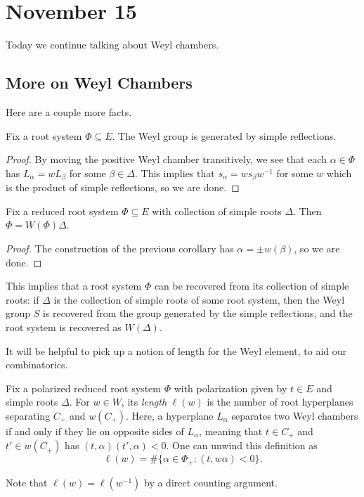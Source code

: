 \documentclass[../notes.tex]{subfiles}
\begin{document}
\section{November 15}
Today we continue talking about Weyl chambers.

\subsection{More on Weyl Chambers}
Here are a couple more facts.
\begin{corollary}
	Fix a root system $\Phi\subseteq E$. The Weyl group is generated by simple reflections.
\end{corollary}
\begin{proof}
	By moving the positive Weyl chamber transitively, we see that each $\alpha\in\Phi$ has $L_\alpha=wL_{\beta}$ for some $\beta\in\Delta$. This implies that $s_\alpha=ws_\beta w^{-1}$ for some $w$ which is the product of simple reflections, so we are done.
\end{proof}
\begin{corollary}
	Fix a reduced root system $\Phi\subseteq E$ with collection of simple roots $\Delta$. Then $\Phi=W(\Phi)\Delta$.
\end{corollary}
\begin{proof}
	The construction of the previous corollary has $\alpha=\pm w(\beta)$, so we are done.
\end{proof}
\begin{remark}
	This implies that a root system $\Phi$ can be recovered from its collection of simple roots: if $\Delta$ is the collection of simple roots of some root system, then the Weyl group $S$ is recovered from the group generated by the simple reflections, and the root system is recovered as $W(\Delta)$.
\end{remark}
It will be helpful to pick up a notion of length for the Weyl element, to aid our combinatorics.
\begin{definition}[length]
	Fix a polarized reduced root system $\Phi$ with polarization given by $t\in E$ and simple roots $\Delta$. For $w\in W$, its \textit{length} $\ell(w)$ is the number of root hyperplanes separating $C_+$ and $w(C_+)$. Here, a hyperplane $L_\alpha$ separates two Weyl chambers if and only if they lie on opposite sides of $L_\alpha$, meaning that $t\in C_+$ and $t'\in w(C_+)$ has $(t,\alpha)(t',\alpha)<0$. One can unwind this definition as
	\[\ell(w)=\#\{\alpha\in\Phi_+:(t,w\alpha)<0\}.\]
\end{definition}
\begin{remark}
	Note that $\ell(w)=\ell\left(w^{-1}\right)$ by a direct counting argument.
\end{remark}
\end{document}

